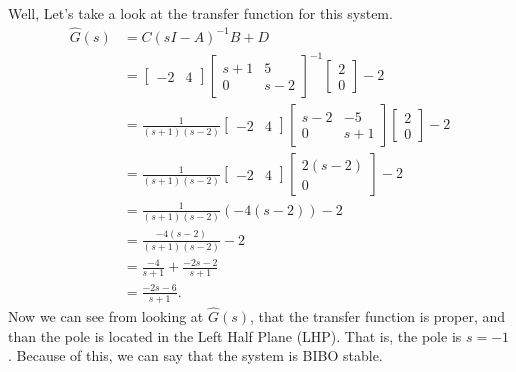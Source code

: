 \documentclass[10pt]{article}
\begin{document}
Well, Let's take a look at the transfer function for this system.
\begin{equation*}
\begin{split}
  \hat{G}(s)
  &= C (sI - A)^{-1}B + D\\
  &=
  \begin{bmatrix}
    -2 & 4
  \end{bmatrix}
  \begin{bmatrix}
    s+1 & 5 \\ 0 & s -2
  \end{bmatrix}^{-1}
  \begin{bmatrix}
    2 \\ 0
  \end{bmatrix} - 2 \\
  &= \frac{1}{(s+1)(s-2)}
  \begin{bmatrix}
    -2 & 4
  \end{bmatrix}
  \begin{bmatrix}
    s-2 & -5 \\ 0 & s+1
  \end{bmatrix}
  \begin{bmatrix}
    2 \\ 0
  \end{bmatrix} - 2\\
  &= \frac{1}{(s+1)(s-2)}
  \begin{bmatrix}
    -2 & 4
  \end{bmatrix}
  \begin{bmatrix}
    2(s-2) \\ 0
  \end{bmatrix} - 2\\
 &= \frac{1}{(s+1)(s-2)} \left(-4\left(s-2\right)\right) - 2\\
 &=\frac{-4(s-2)}{(s+1)(s-2)} - 2\\
 &=\frac{-4}{s+1} + \frac{-2s -2}{s+1}\\
 &=\frac{-2s -6}{s+1}.
\end{split}
\end{equation*}
Now we can see from looking at $\hat{G}(s)$, that the transfer
function is proper, and than the pole is located in the Left Half
Plane (LHP).  That is, the pole is $s = -1$.  Because of this, we can
say that the system is BIBO stable.
\end{document}
